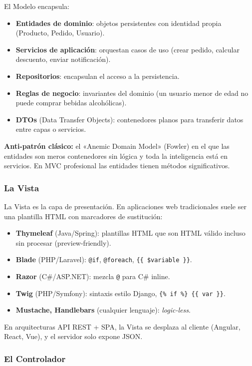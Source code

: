 \documentclass[11pt,a4paper,openany]{book}
\begin{document}
El Modelo encapsula:
\begin{itemize}
\item \textbf{Entidades de dominio}: objetos persistentes con
identidad propia (Producto, Pedido, Usuario).
\item \textbf{Servicios de aplicación}: orquestan casos de uso
(crear pedido, calcular descuento, enviar notificación).
\item \textbf{Repositorios}: encapsulan el acceso a la persistencia.
\item \textbf{Reglas de negocio}: invariantes del dominio
(un usuario menor de edad no puede comprar bebidas alcohólicas).
\item \textbf{DTOs} (Data Transfer Objects): contenedores planos
para transferir datos entre capas o servicios.
\end{itemize}

\textbf{Anti-patrón clásico:} el «Anemic Domain Model» (Fowler) en
el que las entidades son meros contenedores sin lógica y toda la
inteligencia está en servicios. En MVC profesional las entidades
tienen métodos significativos.

\subsubsection{La Vista}

La Vista es la capa de presentación. En aplicaciones web tradicionales
suele ser una plantilla HTML con marcadores de sustitución:

\begin{itemize}
\item \textbf{Thymeleaf} (Java/Spring): plantillas HTML que son HTML
válido incluso sin procesar (preview-friendly).
\item \textbf{Blade} (PHP/Laravel): \texttt{@if}, \texttt{@foreach},
\texttt{\{\{ \$variable \}\}}.
\item \textbf{Razor} (C\#/ASP.NET): mezcla \texttt{@} para C\# inline.
\item \textbf{Twig} (PHP/Symfony): sintaxis estilo Django,
\texttt{\{\% if \%\} \{\{ var \}\}}.
\item \textbf{Mustache, Handlebars} (cualquier lenguaje): \emph{logic-less}.
\end{itemize}

En arquitecturas API REST + SPA, la Vista se desplaza al cliente
(Angular, React, Vue), y el servidor solo expone JSON.

\subsubsection{El Controlador}
\end{document}
